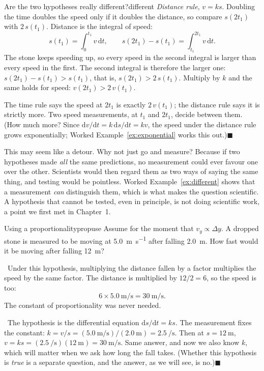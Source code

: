 \documentclass[11pt,twoside,openany]{book}
\newcommand{\dd}{\mathrm{d}}
\newcounter{check}[chapter]
\newcommand{\viewtag}[3]{\fcolorbox{#2}{#3}{\footnotesize\textbf{\textcolor{#2}{#1}}}}
\newcommand{\elemtag}{\viewtag{Elementary}{elemcol}{elempale}}
\newcommand{\calctag}{\viewtag{Calculus}{calccol}{calcpale}}
\newcommand{\elem}{\par\medskip\noindent\elemtag\ }
\newcommand{\calc}{\par\medskip\noindent\calctag\ }
\newcommand{\qed}{\hfill$\blacksquare$}
\begin{document}
\begin{example}{Are the two hypotheses really different?}{different}
\smallskip\noindent\emph{Distance rule}, $v = ks$. Doubling the time doubles the speed only if it doubles the distance, so compare $s(2t_1)$ with $2\,s(t_1)$. Distance is the integral of speed:
\[
s(t_1) = \int_0^{t_1} v\,\dd t, \qquad s(2t_1) - s(t_1) = \int_{t_1}^{2t_1} v\,\dd t .
\]
The stone keeps speeding up, so every speed in the second integral is larger than every speed in the first. The second integral is therefore the larger one: $s(2t_1) - s(t_1) > s(t_1)$, that is, $s(2t_1) > 2\,s(t_1)$. Multiply by $k$ and the same holds for speed: $v(2t_1) > 2\,v(t_1)$.

\smallskip\noindent The time rule says the speed at $2t_1$ is exactly $2\,v(t_1)$; the distance rule says it is strictly more. Two speed measurements, at $t_1$ and $2t_1$, decide between them. (How much more? Since $\dd v/\dd t = k\,\dd s/\dd t = kv$, the speed under the distance rule grows exponentially; Worked Example~\ref{ex:exponential} works this out.)\qed
\end{example}

\begin{modelnote}
This may seem like a detour. Why not just go and measure? Because if two hypotheses made \emph{all} the same predictions, no measurement could ever favour one over the other. Scientists would then regard them as two ways of saying the same thing, and testing would be pointless. Worked Example~\ref{ex:different} shows that a measurement \emph{can} distinguish them, which is what makes the question scientific. A hypothesis that cannot be tested, even in principle, is not doing scientific work, a point we first met in Chapter~1.
\end{modelnote}

\begin{example}{Using a proportionality}{propuse}
Assume for the moment that $v_y \propto \Delta y$. A dropped stone is measured to be moving at \SI{5.0}{\metre\per\second} after falling \SI{2.0}{\metre}. How fast would it be moving after falling \SI{12}{\metre}?

\elem Under this hypothesis, multiplying the distance fallen by a factor multiplies the speed by the same factor. The distance is multiplied by $12/2 = 6$, so the speed is too:
\[
6 \times \SI{5.0}{\metre\per\second} = \SI{30}{\metre\per\second}.
\]
The constant of proportionality was never needed.

\calc The hypothesis is the differential equation $\dd s/\dd t = ks$. The measurement fixes the constant: $k = v/s = (\SI{5.0}{\metre\per\second})/(\SI{2.0}{\metre}) = \SI{2.5}{\per\second}$. Then at $s = \SI{12}{\metre}$, $v = ks = (\SI{2.5}{\per\second})(\SI{12}{\metre}) = \SI{30}{\metre\per\second}$. Same answer, and now we also know $k$, which will matter when we ask how long the fall takes. (Whether this hypothesis is \emph{true} is a separate question, and the answer, as we will see, is no.)\qed
\end{example}
\end{document}
